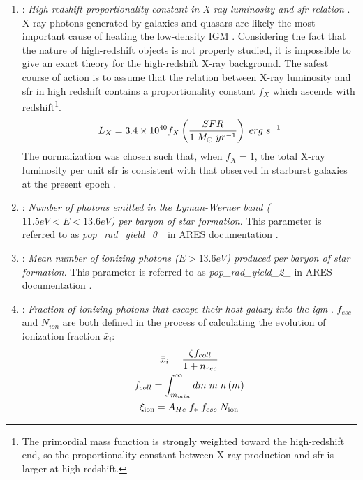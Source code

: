 \documentclass[12pt, TexShade, letterpaper]{report}
\begin{document}
\begin{enumerate}
    \item {}: \emph{High-redshift proportionality constant in X-ray luminosity and \gls{sfr} relation} \cite{ares_documentation}. 
    X-ray photons generated by galaxies and quasars are likely the most important cause of heating the low-density IGM \cite{low_frequency}. Considering the fact that the nature of high-redshift objects is not properly studied, it is impossible to give an exact theory for the high-redshift X-ray background. The safest course of action is to assume that the relation between X-ray luminosity and \gls{sfr} in high redshift contains a proportionality constant $f_X$ which ascends with redshift\footnote{The primordial mass function is strongly weighted toward the high-redshift end, so the proportionality constant between X-ray production and \gls{sfr} is larger at high-redshift.}.
    \begin{equation}
        L_X = 3.4 \times 10^{40} f_X \left( \frac{SFR}{1 \hspace{0.1cm} M_{\odot} \hspace{0.1cm} yr^{-1}}\right) \hspace{0.1cm} erg \hspace{0.1cm}s^{-1}
    \end{equation}
    The normalization was chosen such that, when $f_X =1$, the total X-ray luminosity per unit \gls{sfr} is consistent with that observed in starburst galaxies at the present epoch \cite{low_frequency, 21century}.
    
    \item {}: \emph{Number of photons emitted in the Lyman-Werner band ($11.5eV<E<13.6eV$) per baryon of star formation}. This parameter is referred to as \emph{pop\_rad\_yield\_0\_} in ARES documentation \cite{ares_documentation, lw_background}.
    
    \item {}: \emph{Mean number of ionizing photons ($E>13.6eV$) produced per baryon of star formation}. This parameter is referred to as \emph{pop\_rad\_yield\_2\_} in ARES documentation \cite{ares_documentation, 21century}.
    
    \item {}: \emph{Fraction of ionizing photons that escape their host galaxy into the \gls{igm}} \cite{ares_documentation}.
    $f_{esc}$ and $N_{ion}$ are both defined in the process of calculating the evolution of ionization fraction $\bar{x}_i$:
    \begin{gather}
        \bar{x}_i = \frac{\zeta f_{coll}}{1 + \bar{n}_{rec}}\\
        f_{coll} = \int_{m_{min}}^\infty dm \hspace{0.1cm} m \hspace{0.1cm} n\left(m\right)\\
        \xi_{\text{ion}} = A_{He} \hspace{0.1cm} f_* \hspace{0.1cm} f_{esc} \hspace{0.1cm} N_{\text{ion}} \label{eq:ionizing_efficiency}
    \end{gather}
    

\end{enumerate}
\end{document}
